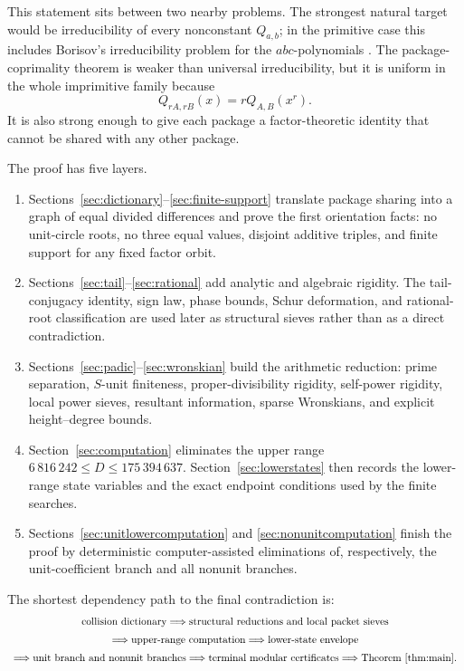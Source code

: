 \documentclass[11pt]{article}
\numberwithin{equation}{section}
\theoremstyle{definition}
\begin{document}
This statement sits between two nearby problems.  The strongest natural target
would be irreducibility of every nonconstant \(Q_{a,b}\); in the primitive
case this includes Borisov's irreducibility problem for the \(abc\)-polynomials
\cite{Borisov1998}.  The package-coprimality theorem is weaker than universal
irreducibility, but it is uniform in the whole imprimitive family because
\[
 Q_{rA,rB}(x)=rQ_{A,B}(x^r).
\]
It is also strong enough to give each package a factor-theoretic identity that
cannot be shared with any other package.

The proof has five layers.
\begin{enumerate}[label=(\arabic*)]
\item Sections~\ref{sec:dictionary}--\ref{sec:finite-support} translate
package sharing into a graph of equal divided differences and prove the first
orientation facts: no unit-circle roots, no three equal values, disjoint
additive triples, and finite support for any fixed factor orbit.
\item Sections~\ref{sec:tail}--\ref{sec:rational} add analytic and
algebraic rigidity.  The tail-conjugacy identity, sign law, phase bounds,
Schur deformation, and rational-root classification are used later as
structural sieves rather than as a direct contradiction.
\item Sections~\ref{sec:padic}--\ref{sec:wronskian} build the arithmetic
reduction: prime separation,
\(S\)-unit finiteness, proper-divisibility rigidity, self-power rigidity, local
power sieves, resultant information, sparse Wronskians, and explicit
height--degree bounds.
\item Section~\ref{sec:computation} eliminates the upper range
\(6\,816\,242\leq D\leq175\,394\,637\).  Section~\ref{sec:lowerstates}
then records the lower-range state variables and the exact endpoint conditions
used by the finite searches.
\item Sections~\ref{sec:unitlowercomputation} and
\ref{sec:nonunitcomputation} finish the proof by deterministic
computer-assisted eliminations of, respectively, the unit-coefficient branch
and all nonunit branches.
\end{enumerate}

The shortest dependency path to the final contradiction is:
\[
\begin{array}{c}
\text{collision dictionary}
\Longrightarrow
\text{structural reductions and local packet sieves}\\[2mm]
\Longrightarrow
\text{upper-range computation}
\Longrightarrow
\text{lower-state envelope}\\[2mm]
\Longrightarrow
\text{unit branch and nonunit branches}
\Longrightarrow
\text{terminal modular certificates}
\Longrightarrow
\text{Theorem~\ref{thm:main}.}
\end{array}
\]
\end{document}
